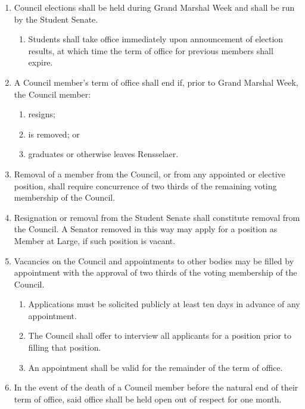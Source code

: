 \begin{enumerate}
\item Council elections shall be held during Grand Marshal Week and shall be run by the Student Senate.
  \begin{enumerate}
  \item Students shall take office immediately upon announcement of election results, at which time the term of office for previous members shall expire.
  \end{enumerate}
\item A Council member's term of office shall end if, prior to Grand Marshal Week, the Council member:
  \begin{enumerate}
  \item resigns;
  \item is removed; or
  \item graduates or otherwise leaves Rensselaer.
  \end{enumerate}
\item Removal of a member from the Council, or from any appointed or elective position, shall require concurrence of two thirds of the remaining voting membership of the Council.
\item Resignation or removal from the Student Senate shall constitute removal from the Council. A Senator removed in this way may apply for a position as Member at Large, if such position is vacant.
\item Vacancies on the Council and appointments to other bodies may be filled by appointment with the approval of two thirds of the voting membership of the Council.
  \begin{enumerate}
  \item Applications must be solicited publicly at least ten days in advance of any appointment.
  \item The Council shall offer to interview all applicants for a position prior to filling that position.
  \item An appointment shall be valid for the remainder of the term of office.
  \end{enumerate}
\item In the event of the death of a Council member before the natural end of their term of office, said office shall be held open out of respect for one month.
\end{enumerate}


